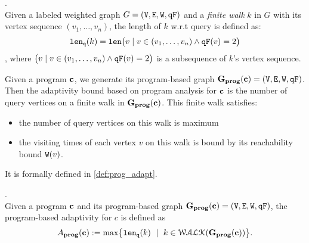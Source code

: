 \documentclass[a4paper,11pt]{article}
\begin{document}
%
%
\begin{defn}.
\\
Given a labeled weighted graph $G = (\mathtt{V}, \mathtt{E}, \mathtt{W}, \mathtt{qF})$ and a \emph{finite walk} $k$ in $G$ with its vertex sequence $(v_1, \ldots, v_{n})$, the length of $k$ w.r.t query is defined as:
\[
	\mathtt{len}_{\tt q}(k) = \mathtt{len}\big(
	v \mid v \in (v_1, \ldots, v_{n}) \land \mathtt{qF}(v) = 2 \big)
\]
, where $\big(v \mid v \in (v_1, \ldots, v_{n}) \land \mathtt{qF}(v) = 2 \big)$ is a subsequence of $k$'s vertex sequence.
\end{defn}
%
Given a program ${\boldsymbol{\mathbf{c}}}$, we generate its program-based graph 
$\mathtt{\bf{G_{prog}}}({\boldsymbol{\mathbf{c}}}) = (\mathtt{V}, \mathtt{E}, \mathtt{W}, \mathtt{qF})$.
%
Then the adaptivity bound based on program analysis for ${\boldsymbol{\mathbf{c}}}$ is the number of query vertices on a finite walk in $\mathtt{\bf{G_{prog}}}({\boldsymbol{\mathbf{c}}})$. This finite walk satisfies:
\begin{itemize}
\item the number of query vertices on this walk is maximum
\item the visiting times of each vertex $v$ on this walk is bound by its reachability bound $\mathtt{W}(v)$.
\end{itemize}
It is formally defined in \ref{def:prog_adapt}.
%
%
\begin{defn}
.
\label{def:prog_adapt}
\\
{
Given a program ${\boldsymbol{\mathbf{c}}}$ and its program-based graph 
$\mathtt{\bf{G_{prog}}}({\boldsymbol{\mathbf{c}}}) = (\mathtt{V}, \mathtt{E}, \mathtt{W}, \mathtt{qF})$,
%
the program-based adaptivity for $c$ is defined as%
\[
\progA(\ssa{c}) 
:= \max
\left\{ \qlen(k)\ \mid \  k\in \walks(\progG(\ssa{c}))\right \}.
\]
}
\end{defn}  
%
\end{document}
